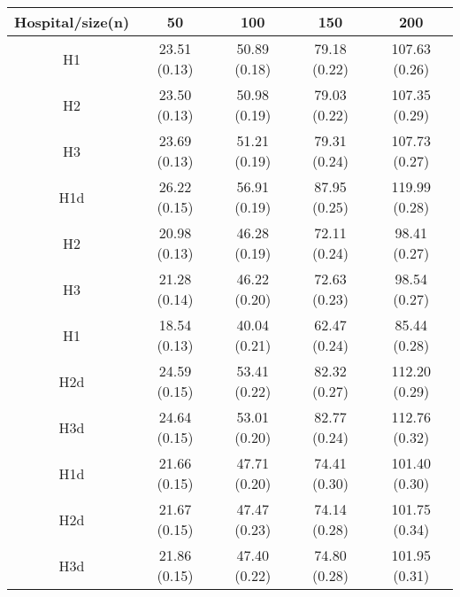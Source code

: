 \begin{center}
\begin{tabular}{c | c | c | c | c}
Hospital/size(n) & 50 & 100 & 150 & 200\\ \hline
H1 & 23.51 (0.13) & 50.89 (0.18) & 79.18 (0.22) & 107.63 (0.26) \\
H2 & 23.50 (0.13) & 50.98 (0.19) & 79.03 (0.22) & 107.35 (0.29) \\
H3 & 23.69 (0.13) & 51.21 (0.19) & 79.31 (0.24) & 107.73 (0.27) \\
H1d & 26.22 (0.15) & 56.91 (0.19) & 87.95 (0.25) & 119.99 (0.28) \\
H2 & 20.98 (0.13) & 46.28 (0.19) & 72.11 (0.24) & 98.41 (0.27) \\
H3 & 21.28 (0.14) & 46.22 (0.20) & 72.63 (0.23) & 98.54 (0.27) \\
H1 & 18.54 (0.13) & 40.04 (0.21) & 62.47 (0.24) & 85.44 (0.28) \\
H2d & 24.59 (0.15) & 53.41 (0.22) & 82.32 (0.27) & 112.20 (0.29) \\
H3d & 24.64 (0.15) & 53.01 (0.20) & 82.77 (0.24) & 112.76 (0.32) \\
H1d & 21.66 (0.15) & 47.71 (0.20) & 74.41 (0.30) & 101.40 (0.30) \\
H2d & 21.67 (0.15) & 47.47 (0.23) & 74.14 (0.28) & 101.75 (0.34) \\
H3d & 21.86 (0.15) & 47.40 (0.22) & 74.80 (0.28) & 101.95 (0.31) \\
\end{tabular}
\end{center}
